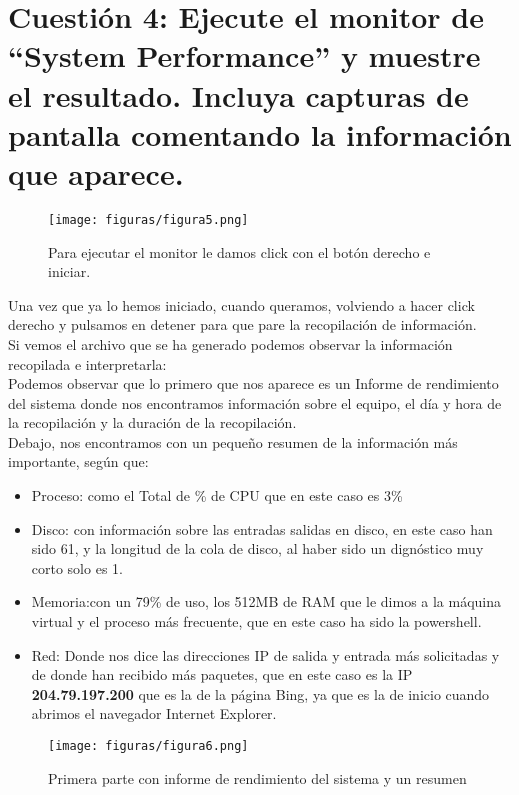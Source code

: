 
\section{Cuestión 4: Ejecute el monitor de “System Performance” y muestre el resultado. Incluya capturas de pantalla comentando la información que aparece.}

\begin{figure}[H] %
	\centering
	\texttt{[image: figuras/figura5.png]}  %
	\label{figura5}
	
	\caption{Para ejecutar el monitor le damos click con el botón derecho e iniciar.} 
\end{figure}

Una vez que ya lo hemos iniciado, cuando queramos, volviendo a hacer click derecho y pulsamos en detener para que pare la recopilación de información.\\
Si vemos el archivo que se ha generado podemos observar la información recopilada e interpretarla:\\

Podemos observar que lo primero que nos aparece es un Informe de rendimiento del sistema donde nos encontramos información sobre el equipo, el día y hora de la recopilación y la duración de la recopilación.\\
Debajo, nos encontramos con un pequeño resumen de la información más importante,
según que:\\
\begin{itemize}
	\item Proceso: como el Total de \% de CPU que en este caso es 3\%
	\item Disco: con información sobre las entradas salidas en disco, en este caso han sido 61, y la longitud de la cola de disco, al haber sido un dignóstico muy corto solo es 1.
	\item Memoria:con un 79\% de uso, los 512MB de RAM que le dimos a la máquina virtual y el proceso más frecuente, que en este caso ha sido la powershell.
	\item Red: Donde nos dice las direcciones IP de salida y entrada más solicitadas y de donde han recibido más paquetes, que en este caso es la IP \textbf{204.79.197.200} que es la de la página Bing, ya que es la de inicio cuando abrimos el navegador Internet Explorer.
\end{itemize} 
\begin{figure}[H] %
	\centering
	\texttt{[image: figuras/figura6.png]}  %
	\label{figura6}
	
	\caption{Primera parte con informe de rendimiento del sistema y un resumen} 
\end{figure}

